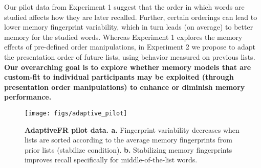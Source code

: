 Our pilot data from Experiment 1 suggest that the order in which words are
studied affects how they are later recalled. Further, certain orderings can
lead to lower memory fingerprint variability, which in turn leads (on average)
to better memory for the studied words. Whereas Experiment 1 explores the
memory effects of pre-defined order manipulations, in Experiment 2 we propose
to adapt the presentation order of future lists, using behavior measured on
previous lists. \textbf{Our overarching goal is to explore whether memory
models that are custom-fit to individual participants may be exploited (through
presentation order manipulations) to enhance or diminish memory performance.}

\begin{wrapfigure}[24]{R}{2in}
  \vspace{-25pt}
  \begin{center}
    \texttt{[image: figs/adaptive\_pilot]}
  \end{center}
\vspace{-20pt}
  \caption{\footnotesize \textbf{AdaptiveFR pilot data. a.} Fingerprint variability decreases when lists are sorted according to the average memory fingerprints from prior lists (stabilize condition).  \textbf{b.}  Stabilizing memory fingerprints improves recall specifically for middle-of-the-list words.}
  \label{fig:adaptive_pilot}
\end{wrapfigure}

